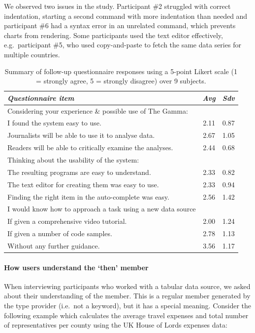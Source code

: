 \documentclass[manuscript,review,anonymous]{acmart}
\begin{document}
We observed two issues in the study. Participant \#2 struggled with correct indentation, starting a second command
with more indentation than needed and participant \#6 had a syntax error in an unrelated command,
which prevents charts from rendering. Some participants used the text editor effectively,
e.g.~participant \#5, who used copy-and-paste to fetch the same data series for multiple countries.

\begin{table}
  \centering
  \begin{tabular}{p{19em} c c}
    \toprule
      {\small \textit{Questionnaire item}} & {\small \textit{Avg}} & {\small \textit{Sdv}} \\
    \midrule
    \small Considering your experience \& possible use of The Gamma:\\
    \small \quad I found the system easy to use. & \small 2.11 & \small 0.87\\
    \small \quad Journalists will be able to use it to analyse data. & \small 2.67 & \small 1.05\\
    \small \quad Readers will be able to critically examine the analyses. & \small 2.44 & \small 0.68\\
    \small Thinking about the usability of the system:\\
    \small \quad The resulting programs are easy to understand. & \small 2.33 & \small 0.82\\
    \small \quad The text editor for creating them was easy to use. & \small 2.33 & \small 0.94\\
    \small \quad Finding the right item in the auto-complete was easy. & \small 2.56 & \small 1.42\\
    \small I would know how to approach a task using a new data source\\
    \small \quad If given a comprehensive video tutorial. & \small 2.00 & \small 1.24\\
    \small \quad If given a number of code samples. & \small 2.78 & \small 1.13\\
    \small \quad Without any further guidance. & \small 3.56 & \small 1.17\\
    \bottomrule
  \end{tabular}
  \caption{Summary of follow-up questionnaire responses using
    a 5-point Likert scale (1 = strongly agree, 5 = strongly disagree) over 9 subjects.}
  \label{tab:quest}
\end{table}

\paragraph{How users understand the `then' member}
When interviewing participants who worked with a tabular data source, we
asked about their understanding of the  member. This is a regular member generated by the
type provider (i.e.~not a keyword), but it has a special meaning. Consider
the following example which calculates the average travel expenses and total number of
representatives per county using the UK House of Lords expenses data:
\end{document}
